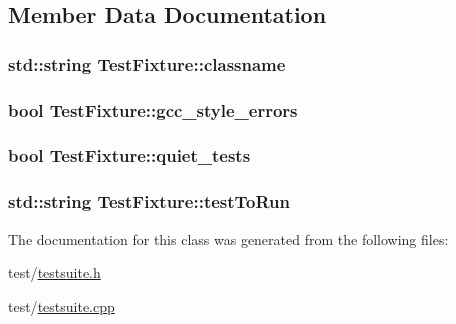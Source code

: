 \subsection{Member Data Documentation}
\hypertarget{class_test_fixture_a5cf001c633b94ff880c53a0af927522c}{
\subsubsection[{classname}]{\setlength{\rightskip}{0pt plus 5cm}std\-::string Test\-Fixture\-::classname\hspace{0.3cm}{\ttfamily [protected]}}}\label{class_test_fixture_a5cf001c633b94ff880c53a0af927522c}
\hypertarget{class_test_fixture_aa349ce738d2399d64bed7e37f2ad2f69}{
\subsubsection[{gcc\-\_\-style\-\_\-errors}]{\setlength{\rightskip}{0pt plus 5cm}bool Test\-Fixture\-::gcc\-\_\-style\-\_\-errors\hspace{0.3cm}{\ttfamily [protected]}}}\label{class_test_fixture_aa349ce738d2399d64bed7e37f2ad2f69}
\hypertarget{class_test_fixture_a3904ba3d7a930a3a61018fbfac5dbc97}{
\subsubsection[{quiet\-\_\-tests}]{\setlength{\rightskip}{0pt plus 5cm}bool Test\-Fixture\-::quiet\-\_\-tests\hspace{0.3cm}{\ttfamily [protected]}}}\label{class_test_fixture_a3904ba3d7a930a3a61018fbfac5dbc97}
\hypertarget{class_test_fixture_acae3d378c5798a5d38236b922524b69a}{
\subsubsection[{test\-To\-Run}]{\setlength{\rightskip}{0pt plus 5cm}std\-::string Test\-Fixture\-::test\-To\-Run\hspace{0.3cm}{\ttfamily [protected]}}}\label{class_test_fixture_acae3d378c5798a5d38236b922524b69a}


The documentation for this class was generated from the following files\-:\begin{DoxyCompactItemize}
\item 
test/\hyperlink{testsuite_8h}{testsuite.\-h}\item 
test/\hyperlink{testsuite_8cpp}{testsuite.\-cpp}\end{DoxyCompactItemize}
